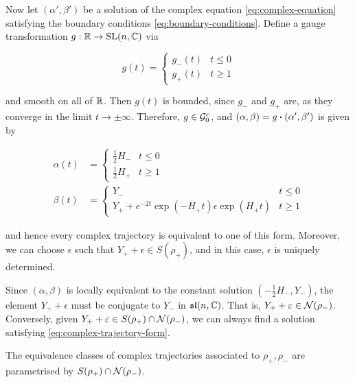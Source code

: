 \documentclass{report}
\renewcommand{\sl}{\mathfrak{sl}}
\begin{document}
Now let \((\alpha', \beta')\) be a solution of the complex equation \cref{eq:complex-equation} satisfying the boundary conditions \cref{eq:boundary-conditions}. Define a gauge transformation \(g : \mathbb{R} \to \operatorname{SL}(n, \mathbb{C})\) via

\begin{equation}
    g(t) = \begin{cases}
        g_-(t) & t \le 0 \\
        g_+(t) & t \ge 1
    \end{cases}
\end{equation}

and smooth on all of \(\mathbb{R}\). Then \(g(t)\) is bounded, since \(g_-\) and \(g_+\) are, as they converge in the limit \(t \to \pm\infty\). Therefore, \(g \in \mathcal{G}_0^c\), and \((\alpha, \beta) = g \vdot (\alpha', \beta')\) is given by

\begin{equation}
    \label{eq:complex-trajectory-form}
    \begin{split}
        \alpha(t) &= \begin{cases}
            \frac{1}{2}H_- & t \le 0 \\
            \frac{1}{2}H_+ & t \ge 1
        \end{cases} \\
        \beta(t) &= \begin{cases}
            Y_- & t \le 0 \\
            Y_+ + e^{-2t}\exp(-H_+t)\epsilon\exp(H_+t) & t \ge 1
        \end{cases}
    \end{split}
\end{equation}

and hence every complex trajectory is equivalent to one of this form. Moreover, we can choose \(\epsilon\) such that \(Y_+ + \epsilon \in S(\rho_+)\), and in this case, \(\epsilon\) is uniquely determined.

Since \((\alpha, \beta)\) is locally equivalent to the constant solution \((-\frac{1}{2}H_-, Y_-)\), the element \(Y_+ + \epsilon\) must be conjugate to \(Y_-\) in \(\sl(n, \C)\). That is, \(Y_+ + \varepsilon \in \mathcal{N}(\rho_-)\). Conversely, given \(Y_+ + \varepsilon \in S(\rho_+) \cap \mathcal{N}(\rho_-)\), we can always find a solution satisfying \cref{eq:complex-trajectory-form}.

\begin{proposition}
    \label{prop:complex-trajectory-classification}

    The equivalence classes of complex trajectories associated to \(\rho_+, \rho_-\) are parametrised by \(S(\rho_+) \cap \mathcal{N}(\rho_-)\).
\end{proposition}
\end{document}
